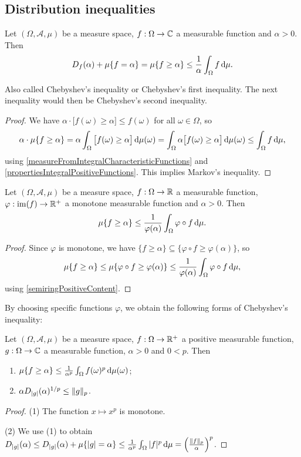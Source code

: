 \subsection{Distribution inequalities}
\begin{proposition}
Let $(\Omega, \mathcal{A}, \mu)$ be a measure space, $f:\Omega\to\mathbb{C}$ a measurable function and $\alpha>0$. Then
\[ D_f(\alpha) + \mu\{f = \alpha\} = \mu\{f\geq \alpha\} \leq \frac{1}{\alpha}\int_\Omega f\operatorname{d \!}{\mu}. \]
\end{proposition}
Also called Chebyshev's inequality or Chebyshev's first inequality. The next inequality would then be Chebyshev's second inequality. 
\begin{proof}
We have $\alpha\cdot \big[f(\omega)\geq \alpha\big]\leq f(\omega)$ for all $\omega\in\Omega$, so
\[ \alpha\cdot \mu\{f\geq \alpha\} = \alpha \int_{\Omega}\big[f(\omega)\geq \alpha\big]\operatorname{d \!}{\mu(\omega)} = \int_{\Omega}\alpha\big[f(\omega)\geq \alpha\big]\operatorname{d \!}{\mu(\omega)} \leq \int_\Omega f\operatorname{d \!}{\mu}, \]
using \ref{measureFromIntegralCharacteristicFunctions} and \ref{propertiesIntegralPositiveFunctions}. This implies Markov's inequality.
\end{proof}
\begin{corollary}
Let $(\Omega, \mathcal{A}, \mu)$ be a measure space, $f:\Omega\to\mathbb{R}$ a measurable function, $\varphi:\operatorname{im}(f) \to \mathbb{R}^+$ a monotone measurable function and $\alpha>0$. Then
\[ \mu\{f\geq \alpha\} \leq \frac{1}{\varphi(\alpha)}\int_\Omega \varphi\circ f\operatorname{d \!}{\mu}. \]
\end{corollary}
\begin{proof}
Since $\varphi$ is monotone, we have $\{f\geq \alpha\} \subseteq \{\varphi\circ f\geq \varphi(\alpha)\}$, so
\[ \mu\{f\geq \alpha\} \leq \mu\{\varphi\circ f\geq \varphi(\alpha)\} \leq \frac{1}{\varphi(\alpha)}\int_\Omega \varphi\circ f\operatorname{d \!}{\mu}, \]
using \ref{semiringPositiveContent}.
\end{proof}
By choosing specific functions $\varphi$, we obtain the following forms of Chebyshev's inequality:
\begin{corollary} \label{ChebyshevInequalityCorollary}
Let $(\Omega, \mathcal{A}, \mu)$ be a measure space, $f:\Omega\to\mathbb{R}^+$ a positive measurable function, $g: \Omega\to \mathbb{C}$ a measurable function, $\alpha>0$ and $0<p$. Then
\begin{enumerate}
\item $\mu\{f\geq \alpha\} \leq \frac{1}{\alpha^p}\int_\Omega f(\omega)^p\operatorname{d \!}{\mu(\omega)}$;
\item $\alpha D_{|g|}(\alpha)^{1/p}\leq \lVert g\rVert_p$.
\end{enumerate}
\end{corollary}
\begin{proof}
(1) The function $x\mapsto x^p$ is monotone.

(2) We use (1) to obtain $D_{|g|}(\alpha) \leq D_{|g|}(\alpha) + \mu\{|g| = \alpha\} \leq \frac{1}{\alpha^p}\int_\Omega |f|^p\operatorname{d \!}{\mu} = \left(\frac{\lVert f\rVert_p}{\alpha}\right)^p$.
\end{proof}

